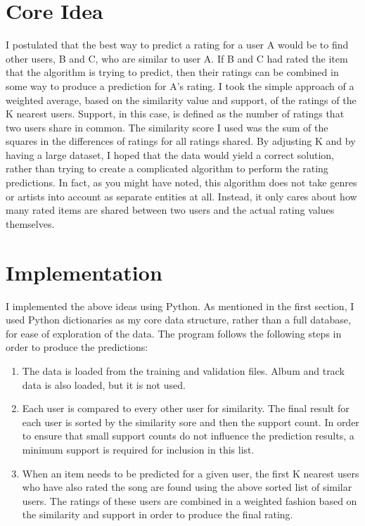 \section{Core Idea}

I postulated that the best way to predict a rating for a user A would be to
find other users, B and C, who are similar to user A. If B and C had rated the
item that the algorithm is trying to predict, then their ratings can be
combined in some way to produce a prediction for A's rating. I took the simple
approach of a weighted average, based on the similarity value and support, of
the ratings of the K nearest users. Support, in this case, is defined as the
number of ratings that two users share in common. The similarity score I used
was the sum of the squares in the differences of ratings for all ratings
shared. By adjusting K and by having a large dataset, I hoped that the data
would yield a correct solution, rather than trying to create a complicated
algorithm to perform the rating predictions. In fact, as you might have noted,
this algorithm does not take genres or artists into account as separate
entities at all. Instead, it only cares about how many rated items are shared
between two users and the actual rating values themselves.

\section{Implementation}

I implemented the above ideas using Python. As mentioned in the first section,
I used Python dictionaries as my core data structure, rather than a full database,
for ease of exploration of the data. The program follows the following steps
in order to produce the predictions:
\begin{enumerate}
   \item The data is loaded from the training and validation files. Album and
   track data is also loaded, but it is not used.
   \item Each user is compared to every other user for similarity. The final
   result for each user is sorted by the similarity sore and then the support
   count. In order to ensure that small support counts do not influence the
   prediction results, a minimum support is required for inclusion in this
   list.
   \item When an item needs to be predicted for a given user, the first K
   nearest users who have also rated the song are found using the above sorted
   list of similar users. The ratings of these users are combined in a
   weighted fashion based on the similarity and support in order to produce
   the final rating.
\end{enumerate}

